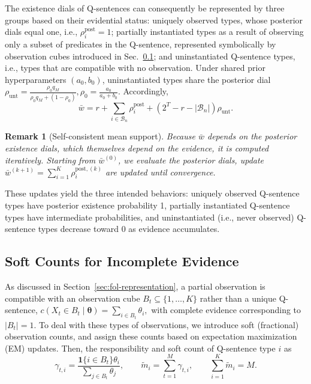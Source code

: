 \documentclass[10pt, conference, letterpaper]{ IEEEtran}
\theoremstyle{bfnote}
\newtheorem{remark}{Remark}
\begin{document}
The existence dials of Q-sentences can consequently be represented by three groups based on their evidential status:
uniquely observed types, whose posterior dials equal one, i.e., $\rho_i^{\mathrm{post}} = 1$; partially
instantiated types as a result of observing only a subset of predicates in the Q-sentence, represented symbolically by observation cubes introduced in Sec.~\ref{subsec:rsdc-partial}; and
uninstantiated Q-sentence types, i.e., types that are compatible with no
    observation. Under shared prior hyperparameters $(a_0,b_0)$, uninstantiated types share
    the posterior dial 
$
\rho_{\mathrm{unt}}
=
\frac{\rho_0q_M}
     {\rho_0q_M+(1-\rho_0)},
\rho_0=\frac{a_0}{a_0+b_0}.
$
Accordingly,
\begin{equation}
\label{eq:rsdc-barm}
\bar w
=
r
+
\sum_{i\in\mathcal{B}_n}\rho_i^{\mathrm{post}}
+
\left(2^T-r-|\mathcal{B}_n|\right)\rho_{\mathrm{unt}}.
\end{equation}

\begin{remark}[Self-consistent mean support]
\label{rem:rsdc-selfconsistency}
Because $\bar w$ depends on the posterior existence dials, which themselves
depend on the evidence, it is computed iteratively. Starting from
$\bar w^{(0)}$, we evaluate the posterior dials, update
$
    \bar w^{(k+1)}
    =
    \sum_{i=1}^{K}\rho_i^{\mathrm{post},(k)}
$
are updated until convergence.
\end{remark}

These updates yield the three intended behaviors: uniquely observed Q-sentence types
have posterior existence probability 1, partially instantiated Q-sentence types have
intermediate probabilities, and uninstantiated (i.e., never observed) Q-sentence types decrease toward 0 as
evidence accumulates.

\subsection{Soft Counts for Incomplete Evidence}
\label{subsec:rsdc-partial}

As discussed in Section~\ref{sec:fol-representation}, a partial observation is compatible with an observation cube
$B_t\subseteq\{1,\ldots,K\}$ rather than a unique Q-sentence, 
$
    c(X_t\in B_t\mid\boldsymbol{\theta})
    =
    \sum_{i\in B_t}\theta_i,
$
with complete evidence corresponding to $|B_t|=1$. To deal with these types of observations, we introduce soft (fractional) observation counts, and assign these counts based on expectation maximization (EM) updates. Then, the responsibility
and soft count of Q-sentence type $i$ as
\begin{equation}
\label{eq:rsdc-soft}
\gamma_{t,i}
=
\frac{
\mathbf{1}\{i\in B_t\}\theta_i
}{
\sum_{j\in B_t}\theta_j
},
\qquad
\widetilde m_i
=
\sum_{t=1}^{M}\gamma_{t,i},
\qquad
\sum_{i=1}^{K}\widetilde m_i=M.
\end{equation}
\end{document}

